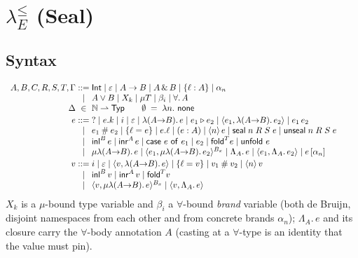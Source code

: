 \documentclass[10pt]{article}
\newcommand{\Int}{\mathsf{Int}}
\newcommand{\tp}{\varepsilon}
\newcommand{\bra}[1]{\alpha_{#1}}
\newcommand{\mrg}{\mathbin{\#}}
\newcommand{\qry}{{?}}
\newcommand{\bx}{\mathbin{\triangleright}}
\newcommand{\wrp}[2]{\langle #1\rangle\,#2}
\newcommand{\sealE}[4]{\mathsf{seal}\;#1\;#2\;#3\;#4}
\newcommand{\unsealE}[4]{\mathsf{unseal}\;#1\;#2\;#3\;#4}
\newcommand{\bv}[1]{\beta_{#1}}
\newcommand{\allb}[1]{\forall.\,#1}
\newcommand{\blam}[2]{\Lambda_{#1}.\,#2}
\newcommand{\bapp}[2]{#1\,[\bra{#2}]}
\newcommand{\fclosx}[4]{\langle #1, \mu\lambda(#2{\to}#3).\,#4\rangle}
\begin{document}
\section{$\lambda_E^{\leq}$ (Seal)}

\subsection{Syntax}

\[
\begin{array}{r@{\;}c@{\;}l@{\qquad}l}
A,B,C,R,S,T,\Gamma &::=& \Int \mid \tp \mid A \to B \mid A \,\&\, B \mid \{\ell : A\} \mid \bra{n} & \\
  &\mid& A \vee B \mid X_k \mid \mu T \mid \bv{i} \mid \allb{A} & \\
\Delta &\in& \mathbb{N} \rightharpoonup \mathsf{Typ} \qquad \emptyset \;=\; \lambda n.\ \mathsf{none} & \\[2pt]
e &::=& \qry \mid e.k \mid i \mid \tp \mid \lambda(A{\to}B).\,e \mid e_1 \bx e_2 \mid \langle e_1, \lambda(A{\to}B).\,e_2\rangle \mid e_1\,e_2 & \\
  &\mid& e_1 \mrg e_2 \mid \{\ell = e\} \mid e.\ell \mid (e : A) \mid \wrp{n}{e} \mid \sealE{n}{R}{S}{e} \mid \unsealE{n}{R}{S}{e} & \\
  &\mid& \mathsf{inl}^{B}\,e \mid \mathsf{inr}^{A}\,e \mid \mathsf{case}\ e\ \mathsf{of}\ e_1 \mid e_2
    \mid \mathsf{fold}^{T} e \mid \mathsf{unfold}\ e & \\
  &\mid& \mu\lambda(A{\to}B).\,e \mid \fclosx{e_1}{A}{B}{e_2}^{B_x}
    \mid \blam{A}{e} \mid \langle e_1, \blam{A}{e_2}\rangle \mid \bapp{e}{n} & \\[2pt]
v &::=& i \mid \tp \mid \langle v, \lambda(A{\to}B).\,e\rangle \mid \{\ell = v\} \mid v_1 \mrg v_2 \mid \wrp{n}{v} & \\
  &\mid& \mathsf{inl}^{B}\,v \mid \mathsf{inr}^{A}\,v \mid \mathsf{fold}^{T} v & \\
  &\mid& \fclosx{v}{A}{B}{e}^{B_x} \mid \langle v, \blam{A}{e}\rangle &
\end{array}
\]
$X_k$ is a $\mu$-bound type variable and $\bv{i}$ a $\forall$-bound \emph{brand}
variable (both de Bruijn, disjoint namespaces from each other and from concrete brands
$\bra{n}$); $\blam{A}{e}$ and its closure carry the $\forall$-body annotation $A$
(casting at a $\forall$-type is an identity that the value must pin).
\end{document}
